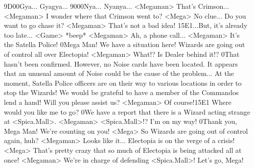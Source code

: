 {9D}{00}Gya... Gyagya... 
{90}{00}Nya... Nyanya... 
<Megaman> That's Crimson... 
<Megaman> I wonder where that Crimson went to? 
<Mega> No clue... 
Do you want to go chase it? 
<Megaman> That's not a bad idea! 
{15}{E1}...But, it's already too late... 
<Game> *beep* 
<Megaman> Ah, a phone call... 
<Megaman> It's the Satella Police! 
0Mega Man! We have a situation here! 
Wizards are going out of control all over Electopia! 
<Megaman> What!? 
Is Dealer behind it!? 
0That hasn't been confirmed. 
However, no Noise cards have been located. 
It appears that an unusual amount of Noise could be the cause of the problem... 
At the moment, Satella Police officers are on their way 
to various locations in order to stop the Wizards! 
We would be grateful to have a member of the Commandos lend a hand! 
Will you please assist us? 
<Megaman> Of course!{15}{E1} Where would you like me to go? 
0We have a report that there is a Wizard acting strange at <Spica.Mall>. 
<Megaman> <Spica.Mall>!? I'm on my way! 
0Thank you, Mega Man! 
We're counting on you! 
<Mega> So Wizards are going out of control again, huh? 
<Megaman> Looks like it... 
Electopia is on the verge of a crisis! 
<Mega> That's pretty crazy that so much of Electopia is being attacked all at once! 
<Megaman> We're in charge of defending <Spica.Mall>! 
Let's go, Mega! 
